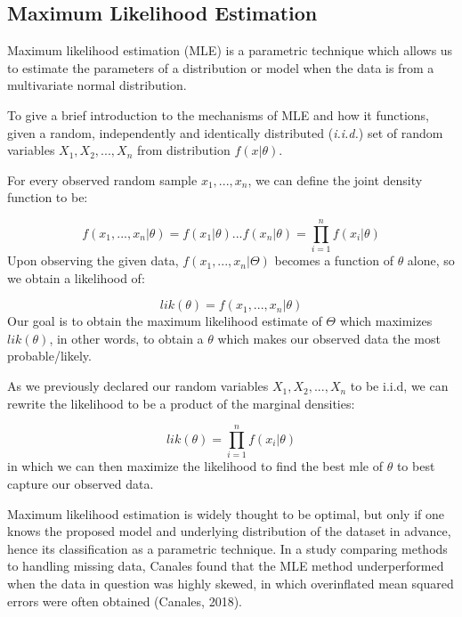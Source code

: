 \documentclass[12pt, twoside]{amherstthesis}
\begin{document}
\hypertarget{MLE}{%
\subsection{Maximum Likelihood Estimation}\label{MLE}}

Maximum likelihood estimation (MLE) is a parametric technique which allows us to estimate the parameters of a distribution or model when the data is from a multivariate normal distribution.

To give a brief introduction to the mechanisms of MLE and how it functions, given a random, independently and identically distributed (\emph{i.i.d.}) set of random variables \(X_1, X_2,...,X_n\) from distribution \(f(x|\theta)\).

For every observed random sample \(x_1,...,x_n\), we can define the joint density function to be:

\[f(x_1,...,x_n|\theta) = f(x_1|\theta)...f(x_n|\theta) = \prod_{i=1}^{n}f(x_i|\theta)\]
Upon observing the given data, \(f(x_1,...,x_n|\Theta)\) becomes a function of \(\theta\) alone, so we obtain a likelihood of:

\[lik(\theta) = f(x_1,...,x_n|\theta)\]
Our goal is to obtain the maximum likelihood estimate of \(\Theta\) which maximizes \(lik(\theta)\), in other words, to obtain a \(\theta\) which makes our observed data the most probable/likely.

As we previously declared our random variables \(X_1, X_2,...,X_n\) to be i.i.d, we can rewrite the likelihood to be a product of the marginal densities:

\[lik(\theta) = \prod_{i=1}^{n} f(x_i|\theta)\]
in which we can then maximize the likelihood to find the best mle of \(\theta\) to best capture our observed data.

Maximum likelihood estimation is widely thought to be optimal, but only if one knows the proposed model and underlying distribution of the dataset in advance, hence its classification as a parametric technique. In a study comparing methods to handling missing data, Canales found that the MLE method underperformed when the data in question was highly skewed, in which overinflated mean squared errors were often obtained (Canales, 2018).
\end{document}
